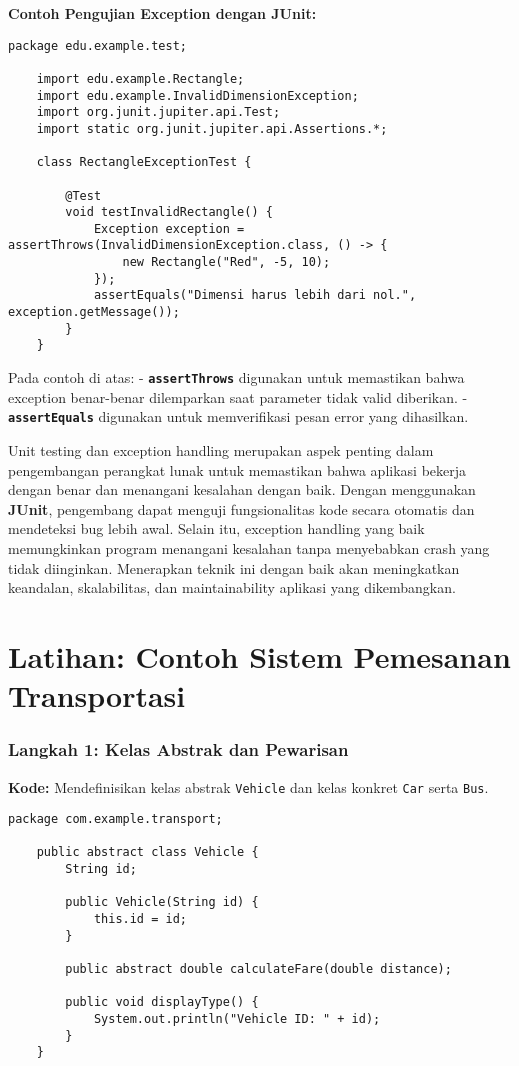 \textbf{Contoh Pengujian Exception dengan JUnit:}

\begin{lstlisting}[style=JavaStyle]
	package edu.example.test;
	
	import edu.example.Rectangle;
	import edu.example.InvalidDimensionException;
	import org.junit.jupiter.api.Test;
	import static org.junit.jupiter.api.Assertions.*;
	
	class RectangleExceptionTest {
		
		@Test
		void testInvalidRectangle() {
			Exception exception = assertThrows(InvalidDimensionException.class, () -> {
				new Rectangle("Red", -5, 10);
			});
			assertEquals("Dimensi harus lebih dari nol.", exception.getMessage());
		}
	}
\end{lstlisting}

Pada contoh di atas:
- \textbf{\texttt{assertThrows}} digunakan untuk memastikan bahwa exception benar-benar dilemparkan saat parameter tidak valid diberikan.
- \textbf{\texttt{assertEquals}} digunakan untuk memverifikasi pesan error yang dihasilkan.


Unit testing dan exception handling merupakan aspek penting dalam pengembangan perangkat lunak untuk memastikan bahwa aplikasi bekerja dengan benar dan menangani kesalahan dengan baik. Dengan menggunakan \textbf{JUnit}, pengembang dapat menguji fungsionalitas kode secara otomatis dan mendeteksi bug lebih awal. Selain itu, exception handling yang baik memungkinkan program menangani kesalahan tanpa menyebabkan crash yang tidak diinginkan. Menerapkan teknik ini dengan baik akan meningkatkan keandalan, skalabilitas, dan maintainability aplikasi yang dikembangkan.


\section{Latihan: Contoh Sistem Pemesanan Transportasi}

\subsubsection{Langkah 1: Kelas Abstrak dan Pewarisan}

\textbf{Kode:} Mendefinisikan kelas abstrak \texttt{Vehicle} dan kelas konkret \texttt{Car} serta \texttt{Bus}.

\begin{lstlisting}[style=JavaStyle, caption={Vehicle.java}]
	package com.example.transport;
	
	public abstract class Vehicle {
		String id;
		
		public Vehicle(String id) {
			this.id = id;
		}
		
		public abstract double calculateFare(double distance);
		
		public void displayType() {
			System.out.println("Vehicle ID: " + id);
		}
	}
\end{lstlisting}


